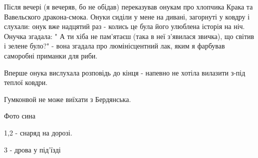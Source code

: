 Після вечері (я вечеряв, бо не обідав) переказував онукам про хлопчика Крака та
Вавельского дракона-смока. Онуки сиділи у мене на дивані, загорнуті у ковдру і
слухали: онук вже надцятий раз - колись це була його улюблена історія на ніч.
Онучка згадала: " А ти хіба не пам'ятаєш (така в неї з'явилася звичка), що
світив і зелене було?" - вона згадала про люмінісцентний лак, яким я фарбував
саморобні приманки для риби.

Вперше онука вислухала розповідь до кінця - напевно не хотіла вилазити з-під
теплої ковдри.

Гумконвой не може виїхати з Бердянська.

Фото сина

1,2 -  снаряд на дорозі.

3 - дрова у під'їзді

